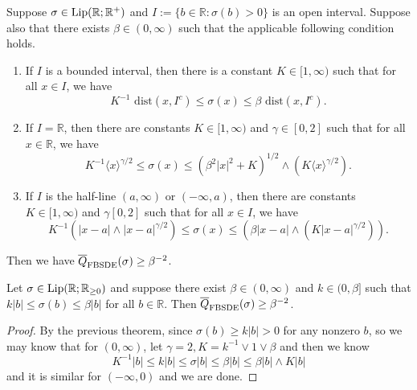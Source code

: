 \begin{theorem}
    Suppose $\sigma \in \text{Lip}(\mathbb{R};\mathbb{R}^+)$ and $I := \{b \in \mathbb{R} : \sigma(b) > 0\}$ is an open interval. Suppose also
that there exists $\beta \in (0,\infty)$ such that the applicable following condition holds.\par
\begin{enumerate}
    \item[(i)] If $I$ is a bounded interval, then there is a constant $K \in [1,\infty)$ such that for all $x\in I$, we have
    \[ K^{-1}\text{ dist}(x,I^c) \leq \sigma(x) \leq \beta \text{ dist}(x,I^c).\]
    \item[(ii)] If $I = \mathbb{R}$, then there are constants $K \in [1,\infty)$ and $\gamma \in [0,2]$ such that for all $x \in \mathbb{R}$, we have
    \[K^{-1}\langle x\rangle^{\gamma/2} \leq \sigma(x) \leq (\beta^2|x|^2 + K)^{1/2}\wedge(K\langle x\rangle^{\gamma/2}).\]
    \item[(iii)] If $I$ is the half-line $(a, \infty)$ or $(−\infty,a)$, then there are constants $K\in [1,\infty)$ and $\gamma [0,2]$ such that
for all $x\in I$, we have
\[K^{-1}(|x-a|\wedge|x-a|^{\gamma/2}) \leq \sigma(x) \leq (\beta|x-a|\wedge(K|x-a|^{\gamma/2})).\]
\end{enumerate}
Then we have $\overline{Q}_{\text{FBSDE}}(\sigma) \geq \beta^{-2}$.
\end{theorem}

\begin{corollary}
    Let $\sigma \in \text{Lip}(\mathbb{R};\mathbb{R}_{\geq 0})$ and suppose there exist $\beta \in (0,\infty)$ and $k\in (0,\beta]$ such that $k|b| \leq \sigma(b) \leq \beta |b|$ for all $b\in \mathbb{R}$. Then $\overline{Q}_{\text{FBSDE}}(\sigma) \geq \beta^{-2}$.
\end{corollary}
\begin{proof}
    By the previous theorem, since $\sigma(b) \geq k|b| > 0$ for any nonzero $b$, so we may know that for $(0,\infty)$, let $\gamma = 2, K = k^{-1}\vee 1\vee \beta$ and then we know
    \[
    K^{-1}|b| \leq k|b| \leq \sigma|b| \leq \beta|b| \leq \beta|b| \wedge K|b|
    \]
    and it is similar for $(-\infty,0)$ and we are done.
\end{proof}
